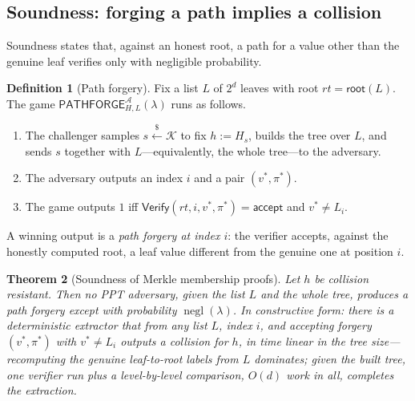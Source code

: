 \documentclass[11pt,a4paper]{article}
\newtheorem{theorem}{Theorem}[section]
\theoremstyle{definition}
\newtheorem{definition}[theorem]{Definition}
\theoremstyle{remark}
\DeclareMathOperator{\negl}{negl}
\begin{document}
\subsection{Soundness: forging a path implies a collision}
\label{merkle:sec-soundness}

Soundness states that, against an honest root, a path for a value other
than the genuine leaf verifies only with negligible probability.

\begin{definition}[Path forgery]\label{merkle:def-forgery}
Fix a list \(L\) of \(2^d\) leaves with root
\(\mathit{rt} = \mathsf{root}(L)\). The game
\(\mathsf{PATHFORGE}^{\mathcal{A}}_{H,L}(\lambda)\) runs as follows.
\begin{enumerate}
\item The challenger samples \(s \xleftarrow{\$} \mathcal{K}\) to fix
  \(h := H_{s}\), builds the tree over \(L\), and sends \(s\)
  together with \(L\)---equivalently, the whole tree---to the
  adversary.
\item The adversary outputs an index \(i\) and a pair
  \((v^{*}, \pi^{*})\).
\item The game outputs \(1\) iff
  \(\mathsf{Verify}(\mathit{rt}, i, v^{*}, \pi^{*}) =
  \mathsf{accept}\) and \(v^{*} \neq L_i\).
\end{enumerate}
A winning output is a \emph{path forgery at index \(i\)}: the
verifier accepts, against the honestly computed root, a leaf value
different from the genuine one at position \(i\).
\end{definition}

\begin{theorem}[Soundness of Merkle membership proofs]
\label{merkle:thm-soundness}
Let \(h\) be collision resistant. Then no PPT adversary, given the
list \(L\) and the whole tree, produces a path forgery except with
probability \(\negl(\lambda)\). In constructive form: there is a
deterministic extractor that from any list \(L\), index \(i\), and
accepting forgery \((v^{*}, \pi^{*})\) with \(v^{*} \neq L_i\)
outputs a collision for \(h\), in time linear in the tree
size---recomputing the genuine leaf-to-root labels from \(L\)
dominates; given the built tree, one verifier run plus a
level-by-level comparison, \(O(d)\) work in all, completes the
extraction.
\end{theorem}
\end{document}

